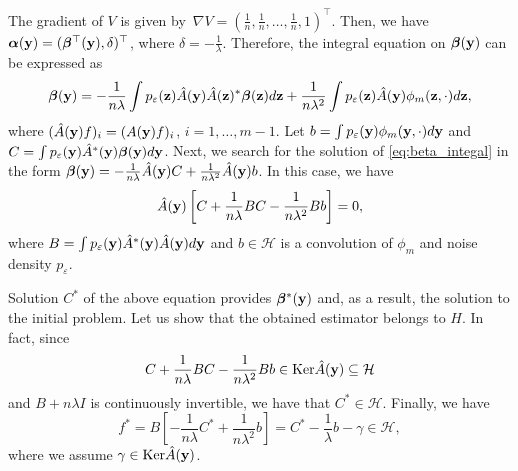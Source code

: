 The gradient of $V$ is given
by~$\nabla V = (\frac{1}{n}, \frac{1}{n}, \ldots, \frac{1}{n}, 1)^{\top}$.
Then, we have ${\bm \alpha}({\bf y}) = ({\bm \beta}^{\top}({\bf y}), \delta)^{\top}$,
where $\delta = -\frac{1}{\lambda}$.
Therefore, the integral equation on ${\bm \beta}({\bf y})$ can be expressed as
\begin{equation}
    {\bm \beta}({\bf y}) = -\frac{1}{n\lambda}\int p_{\varepsilon}({\bf z})\hat{A}({\bf y})\hat{A}({\bf z})^*{\bm \beta}({\bf z})d{\bf z} + \frac{1}{n\lambda^2}\int p_{\varepsilon}({\bf z}) \hat{A}({\bf y}) \phi_m({\bf z}, \cdot)d{\bf z},
\end{equation}
where $(\hat{A}({\bf y})f)_i = (A({\bf y})f)_i$, $i = 1, \ldots, m - 1$.
Let $b = \int p_{\varepsilon}({\bf y})\phi_m({\bf y}, \cdot) d {\bf y}$ and
$C = \int p_{\varepsilon}({\bf y})\hat{A}^*({\bf y}){\bm \beta}({\bf y}) d {\bf y}$.
Next, we search for the solution of \eqref{eq:beta_integal} in the form
${\bm \beta}({\bf y}) = -\frac{1}{n\lambda}\hat{A}({\bf y})C + \frac{1}{n\lambda^2}\hat{A}({\bf y})b$.
In this case, we have
\begin{equation*}
    \hat{A}({\bf y})\left[C + \frac{1}{n\lambda}BC - \frac{1}{n\lambda^2}Bb\right] = 0,
\end{equation*}
where $B = \int p_{\varepsilon}({\bf y})\hat{A}^*({\bf y})\hat{A}({\bf y}) d{\bf y}$ and
$b \in \mathcal{H}$ is a convolution of $\phi_m$ and noise density $p_{\varepsilon}$.

Solution $C^*$ of the above equation provides ${\bm \beta}^*({\bf y})$ and, as a result,
the solution to the initial problem.
Let us show that the obtained estimator belongs to $H$.
In fact, since
\[
    C + \frac{1}{n\lambda}BC - \frac{1}{n\lambda^2}Bb \in {\rm Ker}\hat{A}({\bf y}) \subseteq
    \mathcal{H}
\]
and $B + n\lambda I$ is continuously invertible, we have that $C^* \in \mathcal{H}$.
Finally, we have
\[
    f^* = B\left[-\frac{1}{n\lambda}C^* + \frac{1}{n\lambda^2}b\right] = C^* - \frac{1}{\lambda}b - \gamma \in \mathcal{H},
\]
where we assume $\gamma \in {\rm Ker}\hat{A}({\bf y})$.



